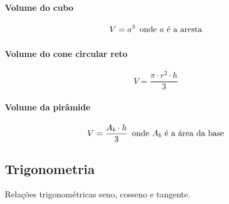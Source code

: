 \paragraph{Volume do cubo}\label{volume-do-cubo}

\[
V = a^3 \text{\, onde $a$ é a aresta}
\]

\paragraph{Volume do cone circular
reto}\label{volume-do-cone-circular-reto}

\[
V = \frac{\pi \cdot r^2 \cdot h}{3}
\]

\paragraph{Volume da pirâmide}\label{volume-da-piruxe2mide}

\[
V = \frac{A_b \cdot h}{3} \text{\, onde $A_b$ é a área da base}
\]

\subsection{Trigonometria}\label{trigonometria}

Relações trigonométricas seno, cosseno e tangente.

